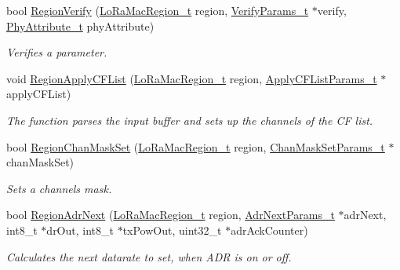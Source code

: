 \begin{DoxyCompactItemize}
bool \mbox{\hyperlink{group___r_e_g_i_o_n_ga7c1ff626bc1131889fa8de3197a1093a}{Region\+Verify}} (\mbox{\hyperlink{group___l_o_r_a_m_a_c_ga80c48efda9ae02e14b58160d34a798dd}{Lo\+Ra\+Mac\+Region\+\_\+t}} region, \mbox{\hyperlink{group___r_e_g_i_o_n_ga966d97bc2f25df1c09e92e60ef652276}{Verify\+Params\+\_\+t}} $\ast$verify, \mbox{\hyperlink{group___r_e_g_i_o_n_ga9445b07fdf77581ecfaf389970e635f8}{Phy\+Attribute\+\_\+t}} phy\+Attribute)
\begin{DoxyCompactList}\small\item\em Verifies a parameter. \end{DoxyCompactList}\item 
void \mbox{\hyperlink{group___r_e_g_i_o_n_gae3fdd82182ebb0704adb2a017d30e1f2}{Region\+Apply\+C\+F\+List}} (\mbox{\hyperlink{group___l_o_r_a_m_a_c_ga80c48efda9ae02e14b58160d34a798dd}{Lo\+Ra\+Mac\+Region\+\_\+t}} region, \mbox{\hyperlink{group___r_e_g_i_o_n_ga71588e9ad07e34b78fa91d51881fd3c6}{Apply\+C\+F\+List\+Params\+\_\+t}} $\ast$apply\+C\+F\+List)
\begin{DoxyCompactList}\small\item\em The function parses the input buffer and sets up the channels of the CF list. \end{DoxyCompactList}\item 
bool \mbox{\hyperlink{group___r_e_g_i_o_n_ga795ed3c13f4c8d03e39298fd64e5b2df}{Region\+Chan\+Mask\+Set}} (\mbox{\hyperlink{group___l_o_r_a_m_a_c_ga80c48efda9ae02e14b58160d34a798dd}{Lo\+Ra\+Mac\+Region\+\_\+t}} region, \mbox{\hyperlink{group___r_e_g_i_o_n_ga6d24f7da136006410827dfb29f6b9b9e}{Chan\+Mask\+Set\+Params\+\_\+t}} $\ast$chan\+Mask\+Set)
\begin{DoxyCompactList}\small\item\em Sets a channels mask. \end{DoxyCompactList}\item 
bool \mbox{\hyperlink{group___r_e_g_i_o_n_ga08cac64beeadd0555460ca5e756a0792}{Region\+Adr\+Next}} (\mbox{\hyperlink{group___l_o_r_a_m_a_c_ga80c48efda9ae02e14b58160d34a798dd}{Lo\+Ra\+Mac\+Region\+\_\+t}} region, \mbox{\hyperlink{group___r_e_g_i_o_n_ga567c2742622326b350b4e91bbf61b4ce}{Adr\+Next\+Params\+\_\+t}} $\ast$adr\+Next, int8\+\_\+t $\ast$dr\+Out, int8\+\_\+t $\ast$tx\+Pow\+Out, uint32\+\_\+t $\ast$adr\+Ack\+Counter)
\begin{DoxyCompactList}\small\item\em Calculates the next datarate to set, when A\+DR is on or off. \end{DoxyCompactList}\item 

\end{DoxyCompactItemize}
